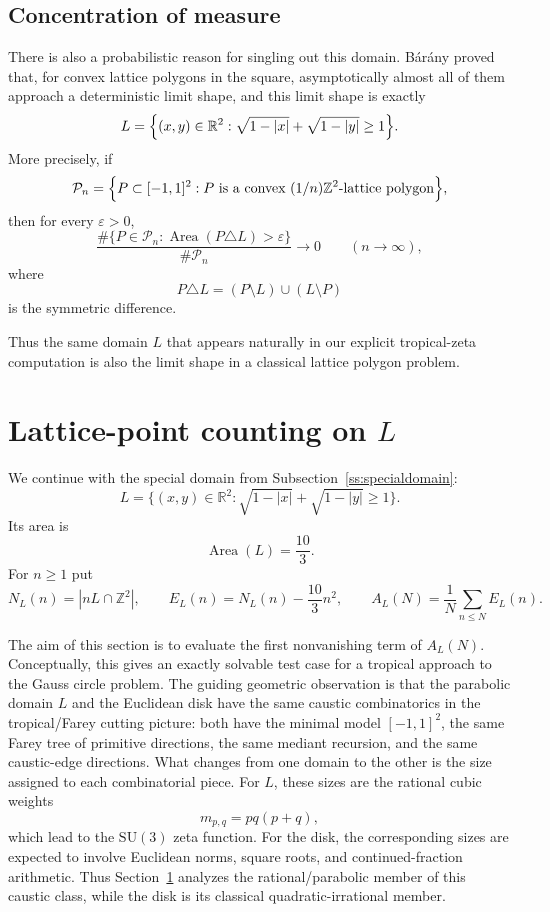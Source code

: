 \documentclass[a4paper,american,11pt]{amsart}
\theoremstyle{plain}
\theoremstyle{definition}
\newcommand{\Z}{\mathbb Z}
\newcommand{\R}{\mathbb R}
\DeclareMathOperator{\Area}{Area}
\begin{document}
\subsection{Concentration of measure}

There is also a probabilistic reason for singling out this domain. Bárány
proved \cite{Barany1995} that, for convex lattice polygons in the square,
asymptotically almost all of them approach a deterministic limit shape, and
this limit shape is exactly
\[
L
=
\Bigl\{
(x,y)\in\R^2:\sqrt{1-|x|}+\sqrt{1-|y|}\ge 1
\Bigr\}.
\]
More precisely, if
\[
\mathcal P_n
=
\Bigl\{
P\subset[-1,1]^2:
P \text{ is a convex } (1/n)\Z^2\text{-lattice polygon}
\Bigr\},
\]
then for every \(\varepsilon>0\),
\[
\frac{
\#\{P\in\mathcal P_n:\Area(P\triangle L)>\varepsilon\}
}{
\#\mathcal P_n
}
\longrightarrow 0
\qquad (n\to\infty),
\]
where
\[
P\triangle L=(P\setminus L)\cup(L\setminus P)
\]
is the symmetric difference.

Thus the same domain \(L\) that appears naturally in our explicit
tropical-zeta computation is also the limit shape in a classical lattice
polygon problem.

\section{\texorpdfstring{Lattice-point counting on \(L\)}{Lattice-point counting on L}}\label{sec_6}

We continue with the special domain from Subsection~\ref{ss:specialdomain}:
\begin{equation}\label{eq:Ldomain}
L=\{(x,y)\in \R^2:\sqrt{1-|x|}+\sqrt{1-|y|}\ge 1\}.
\end{equation}
Its area is
\begin{equation}\label{eq:areaL}
\Area(L)=\frac{10}{3}.
\end{equation}
For \(n\ge1\) put
\begin{equation}\label{eq:NLAL}
N_L(n)=|nL\cap\Z^2|,
\qquad
E_L(n)=N_L(n)-\frac{10}{3}n^2,
\qquad
A_L(N)=\frac1N\sum_{n\le N}E_L(n).
\end{equation}

The aim of this section is to evaluate the first nonvanishing term of
\(A_L(N)\). Conceptually, this gives an exactly solvable test case for a
tropical approach to the Gauss circle problem. The guiding geometric
observation is that the parabolic domain \(L\) and the Euclidean disk have
the same caustic combinatorics in the tropical/Farey cutting picture: both
have the minimal model \([-1,1]^2\), the same Farey tree of primitive
directions, the same mediant recursion, and the same caustic-edge directions. What changes from
one domain to the other is the size assigned to each combinatorial piece. For
\(L\), these sizes are the rational cubic weights
\[
m_{p,q}=pq(p+q),
\]
which lead to the \(\mathrm{SU}(3)\) zeta function. For the disk, the
corresponding sizes are expected to involve Euclidean norms, square roots,
and continued-fraction arithmetic. Thus Section~\ref{sec_6} analyzes the rational/parabolic member of this
caustic class, while the disk is its classical quadratic-irrational member.
\end{document}
